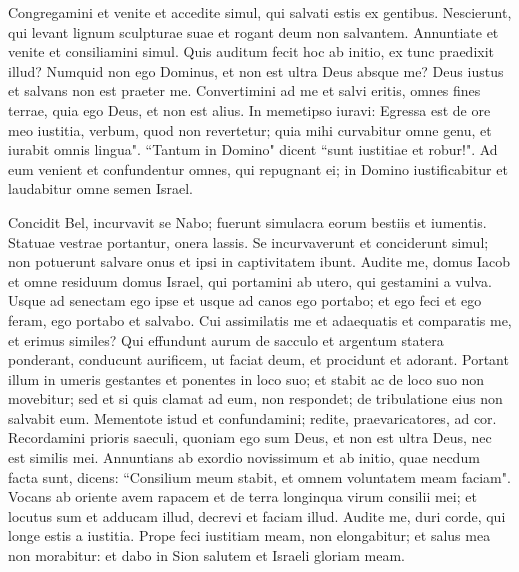 \begin{biblechapter}
\verse Congregamini et venite et accedite simul, qui salvati estis ex gentibus. Nescierunt, qui levant lignum sculpturae suae et rogant deum non salvantem. 
\verse Annuntiate et venite et consiliamini simul. Quis auditum fecit hoc ab initio, ex tunc praedixit illud? Numquid non ego Dominus, et non est ultra Deus absque me? Deus iustus et salvans non est praeter me. 
\verse Convertimini ad me et salvi eritis, omnes fines terrae, quia ego Deus, et non est alius. 
\verse In memetipso iuravi: Egressa est de ore meo iustitia, verbum, quod non revertetur; quia mihi curvabitur omne genu, et iurabit omnis lingua". 
\verse “Tantum in Domino" dicent “sunt iustitiae et robur!". Ad eum venient et confundentur omnes, qui repugnant ei; 
\verse in Domino iustificabitur et laudabitur omne semen Israel. 
\end{biblechapter}

\begin{biblechapter}  
\verse Concidit Bel, incurvavit se Nabo; fuerunt simulacra eorum bestiis et iumentis. Statuae vestrae portantur, onera lassis. 
\verse Se incurvaverunt et conciderunt simul; non potuerunt salvare onus et ipsi in captivitatem ibunt. 
\verse Audite me, domus Iacob et omne residuum domus Israel, qui portamini ab utero, qui gestamini a vulva. 
\verse Usque ad senectam ego ipse et usque ad canos ego portabo; et ego feci et ego feram, ego portabo et salvabo. 
\verse Cui assimilatis me et adaequatis et comparatis me, et erimus similes? 
\verse Qui effundunt aurum de sacculo et argentum statera ponderant, conducunt aurificem, ut faciat deum, et procidunt et adorant. 
\verse Portant illum in umeris gestantes et ponentes in loco suo; et stabit ac de loco suo non movebitur; sed et si quis clamat ad eum, non respondet; de tribulatione eius non salvabit eum. 
\verse Mementote istud et confundamini; redite, praevaricatores, ad cor. 
\verse Recordamini prioris saeculi, quoniam ego sum Deus, et non est ultra Deus, nec est similis mei. 
\verse Annuntians ab exordio novissimum et ab initio, quae necdum facta sunt, dicens: “Consilium meum stabit, et omnem voluntatem meam faciam". 
\verse Vocans ab oriente avem rapacem et de terra longinqua virum consilii mei; et locutus sum et adducam illud, decrevi et faciam illud. 
\verse Audite me, duri corde, qui longe estis a iustitia. 
\verse Prope feci iustitiam meam, non elongabitur; et salus mea non morabitur: et dabo in Sion salutem et Israeli gloriam meam. 
\end{biblechapter}

